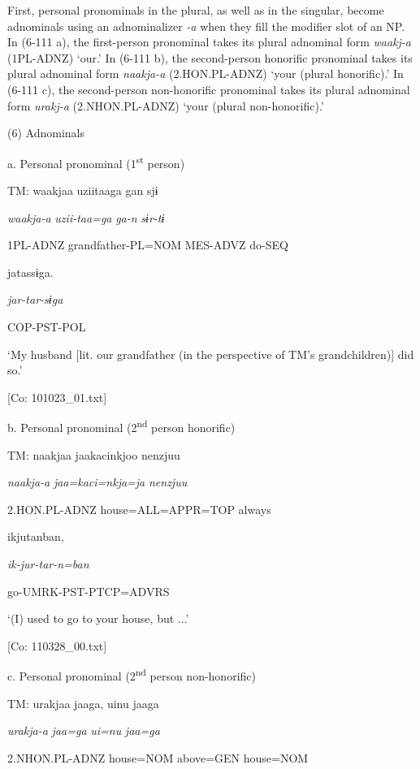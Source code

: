 First, personal pronominals in the plural, as well as in the singular, become adnominals using an adnominalizer \textit{{}-a} when they fill the modifier slot of an NP. In (6-111 a), the first-person pronominal takes its plural adnominal form \textit{waakj-a} (1PL-ADNZ) ‘our.’ In (6-111 b), the second-person honorific pronominal takes its plural adnominal form \textit{naakja-a} (2.HON.PL-ADNZ) ‘your (plural honorific).’ In (6-111 c), the second-person non-honorific pronominal takes its plural adnominal form \textit{urakj-a} (2.NHON.PL-ADNZ) ‘your (plural non-honorific).’

(6)  Adnominals

  a.  Personal pronominal (1\textsuperscript{st} person)

    TM:  waakjaa  uziitaaga  gan  sjɨ

      \textit{waakja-a}  \textit{uzii-taa=ga}  \textit{ga-n}  \textit{sɨr-tɨ}

      1PL-ADNZ  grandfather-PL=NOM  MES-ADVZ  do-SEQ

      jatassɨga.

      \textit{jar-tar-sɨga}

      COP-PST-POL

      ‘My husband [lit. our grandfather (in the perspective of TM’s grandchildren)] did so.’

      [Co: 101023\_01.txt]

  b.  Personal pronominal (2\textsuperscript{nd} person honorific)

    TM:  naakjaa  jaakacinkjoo  {\textbar}nenzjuu{\textbar}

      \textit{naakja-a}  \textit{jaa=kaci=nkja=ja}  \textit{nenzjuu}

      2.HON.PL-ADNZ  house=ALL=APPR=TOP  always

      ikjutanban,

      \textit{ik-jur-tar-n=ban}

      go-UMRK-PST-PTCP=ADVRS

      ‘(I) used to go to your house, but ...’

      [Co: 110328\_00.txt]

  c.  Personal pronominal (2\textsuperscript{nd} person non-honorific)

    TM:  urakjaa  jaaga,  uinu  jaaga

      \textit{urakja-a}  \textit{jaa=ga}  \textit{ui=nu}  \textit{jaa=ga}

      2.NHON.PL-ADNZ  house=NOM  above=GEN  house=NOM

